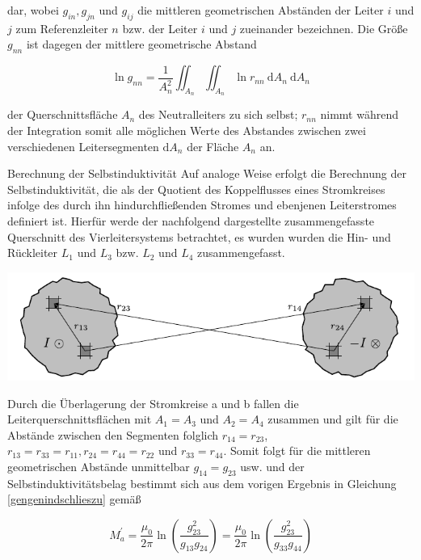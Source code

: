 dar, wobei $g_{i n}, g_{j n}$ und $g_{i j}$ die mittleren geometrischen Abständen der Leiter $i$ und $j$ zum Referenzleiter $n$ bzw. der Leiter $i$ und $j$ zueinander bezeichnen. Die Größe $g_{n n}$ ist dagegen der mittlere geometrische Abstand


\begin{equation}
	\ln g_{n n}=\frac{1}{A_{n}^{2}} \iint_{A_{n}} \iint_{A_{n}} \ln r_{n n} \mathrm{~d} A_{n} \mathrm{~d} A_{n} 
\end{equation}


der Querschnittsfläche $A_{n}$ des Neutralleiters zu sich selbst; $r_{n n}$ nimmt während der Integration somit alle möglichen Werte des Abstandes zwischen zwei verschiedenen Leitersegmenten $\mathrm{d} A_{n}$ der Fläche $A_{n}$ an.

Berechnung der Selbstinduktivität Auf analoge Weise erfolgt die Berechnung der Selbstinduktivität, die als der Quotient des Koppelflusses eines Stromkreises infolge des durch ihn hindurchfließenden Stromes und ebenjenen Leiterstromes definiert ist. Hierfür werde der nachfolgend dargestellte zusammengefasste Querschnitt des Vierleitersystems betrachtet, es wurden wurden die Hin- und Rückleiter $L_{1}$ und $L_{3}$ bzw. $L_{2}$ und $L_{4}$ zusammengefasst.

\begin{center}
	\includegraphics{res/LT11}
\end{center}


Durch die Überlagerung der Stromkreise a und b fallen die Leiterquerschnittsflächen mit $A_{1}=A_{3}$ und $A_{2}=A_{4}$ zusammen und gilt für die Abstände zwischen den Segmenten folglich $r_{14}=r_{23}$, $r_{13}=r_{33}=r_{11}, r_{24}=r_{44}=r_{22}$ und $r_{33}=r_{44}$. Somit folgt für die mittleren geometrischen Abstände unmittelbar $g_{14}=g_{23}$ usw. und der Selbstinduktivitätsbelag bestimmt sich aus dem vorigen Ergebnis in Gleichung \ref{gengenindschlieszu} gemäß


\begin{equation}\label{gleigem}
	M_{a}^{\prime}=\frac{\mu_{0}}{2 \pi} \ln \left(\frac{g_{23}^{2}}{g_{13} g_{24}}\right)=\frac{\mu_{0}}{2 \pi} \ln \left(\frac{g_{23}^{2}}{g_{33} g_{44}}\right) 
\end{equation}


